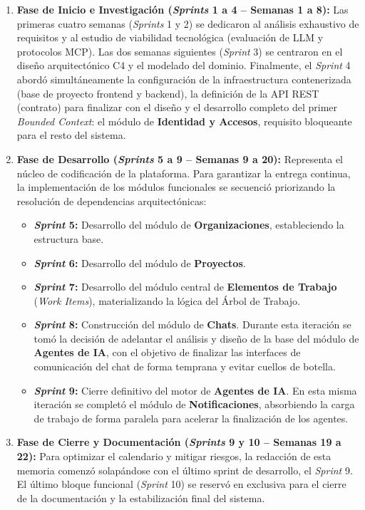 \begin{enumerate}
    \item \textbf{Fase de Inicio e Investigación (\emph{Sprints} 1 a 4 -- Semanas 1 a 8):} Las primeras cuatro semanas (\emph{Sprints} 1 y 2) se dedicaron al análisis exhaustivo de requisitos y al estudio de viabilidad tecnológica (evaluación de \ac{LLM} y protocolos \ac{MCP}). Las dos semanas siguientes (\emph{Sprint} 3) se centraron en el diseño arquitectónico C4 y el modelado del dominio. Finalmente, el \emph{Sprint} 4 abordó simultáneamente la configuración de la infraestructura contenerizada (base de proyecto frontend y backend), la definición de la \ac{API} REST (contrato) para finalizar con el diseño y el desarrollo completo del primer \emph{Bounded Context}: el módulo de \textbf{Identidad y Accesos}, requisito bloqueante para el resto del sistema.
    
    \item \textbf{Fase de Desarrollo (\emph{Sprints} 5 a 9 -- Semanas 9 a 20):} Representa el núcleo de codificación de la plataforma. Para garantizar la entrega continua, la implementación de los módulos funcionales se secuenció priorizando la resolución de dependencias arquitectónicas:
    \begin{itemize}
        \item \textbf{\emph{Sprint} 5:} Desarrollo del módulo de \textbf{Organizaciones}, estableciendo la estructura base.
        \item \textbf{\emph{Sprint} 6:} Desarrollo del módulo de \textbf{Proyectos}.
        \item \textbf{\emph{Sprint} 7:} Desarrollo del módulo central de \textbf{Elementos de Trabajo} (\emph{Work Items}), materializando la lógica del Árbol de Trabajo.
        \item \textbf{\emph{Sprint} 8:} Construcción del módulo de \textbf{Chats}. Durante esta iteración se tomó la decisión de adelantar el análisis y diseño de la base del módulo de \textbf{Agentes de \ac{IA}}, con el objetivo de finalizar las interfaces de comunicación del chat de forma temprana y evitar cuellos de botella.
        \item \textbf{\emph{Sprint} 9:} Cierre definitivo del motor de \textbf{Agentes de IA}. En esta misma iteración se completó el módulo de \textbf{Notificaciones}, absorbiendo la carga de trabajo de forma paralela para acelerar la finalización de los agentes.
    \end{itemize}
    
    \item \textbf{Fase de Cierre y Documentación (\emph{Sprints} 9 y 10 -- Semanas 19 a 22):} Para optimizar el calendario y mitigar riesgos, la redacción de esta memoria comenzó solapándose con el último sprint de desarrollo, el \emph{Sprint} 9. El último bloque funcional (\emph{Sprint} 10) se reservó en exclusiva para el cierre de la documentación y la estabilización final del sistema.
\end{enumerate}

